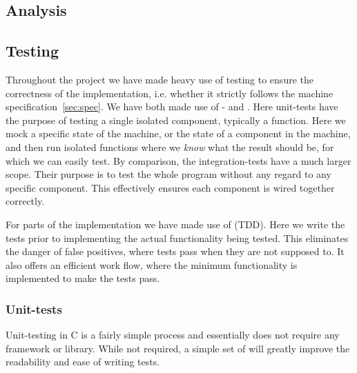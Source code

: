 




\subsection{Analysis}

\subsection{Testing}


Throughout the project we have made heavy use of testing to ensure the
correctness of the implementation, i.e. whether it strictly follows the machine
specification~\ref{sec:spec}. We have both made use of - and
. Here unit-tests have the purpose of testing a single
isolated component, typically a function. Here we mock a specific state of the
machine, or the state of a component in the machine, and then run isolated
functions where we {\it know} what the result should be, for which we can easily
test. By comparison, the integration-tests have a much larger scope. Their
purpose is to test the whole program without any regard to any specific
component. This effectively ensures each component is wired together correctly.

For parts of the implementation we have made use of  (TDD). Here we write the tests prior to implementing the actual
functionality being tested. This eliminates the danger of false positives, where
tests pass when they are not supposed to. It also offers an efficient work flow,
where the minimum functionality is implemented to make the tests pass.

\subsubsection{Unit-tests}
Unit-testing in C is a fairly simple process and essentially does not require
any framework or library. While not required, a simple set of  will
greatly improve the readability and ease of writing tests.

